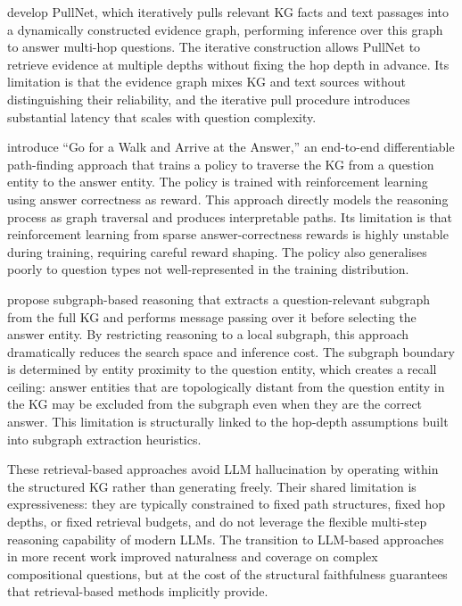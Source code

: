 \citet{sun2019pullnet} develop PullNet, which iteratively pulls relevant KG facts and text passages into a dynamically constructed evidence graph, performing inference over this graph to answer multi-hop questions. The iterative construction allows PullNet to retrieve evidence at multiple depths without fixing the hop depth in advance. Its limitation is that the evidence graph mixes KG and text sources without distinguishing their reliability, and the iterative pull procedure introduces substantial latency that scales with question complexity.

\citet{das2017go} introduce ``Go for a Walk and Arrive at the Answer,'' an end-to-end differentiable path-finding approach that trains a policy to traverse the KG from a question entity to the answer entity. The policy is trained with reinforcement learning using answer correctness as reward. This approach directly models the reasoning process as graph traversal and produces interpretable paths. Its limitation is that reinforcement learning from sparse answer-correctness rewards is highly unstable during training, requiring careful reward shaping. The policy also generalises poorly to question types not well-represented in the training distribution.

\citet{zhang2022subgraph} propose subgraph-based reasoning that extracts a question-relevant subgraph from the full KG and performs message passing over it before selecting the answer entity. By restricting reasoning to a local subgraph, this approach dramatically reduces the search space and inference cost. The subgraph boundary is determined by entity proximity to the question entity, which creates a recall ceiling: answer entities that are topologically distant from the question entity in the KG may be excluded from the subgraph even when they are the correct answer. This limitation is structurally linked to the hop-depth assumptions built into subgraph extraction heuristics.

These retrieval-based approaches avoid LLM hallucination by operating within the structured KG rather than generating freely. Their shared limitation is expressiveness: they are typically constrained to fixed path structures, fixed hop depths, or fixed retrieval budgets, and do not leverage the flexible multi-step reasoning capability of modern LLMs. The transition to LLM-based approaches in more recent work improved naturalness and coverage on complex compositional questions, but at the cost of the structural faithfulness guarantees that retrieval-based methods implicitly provide.

